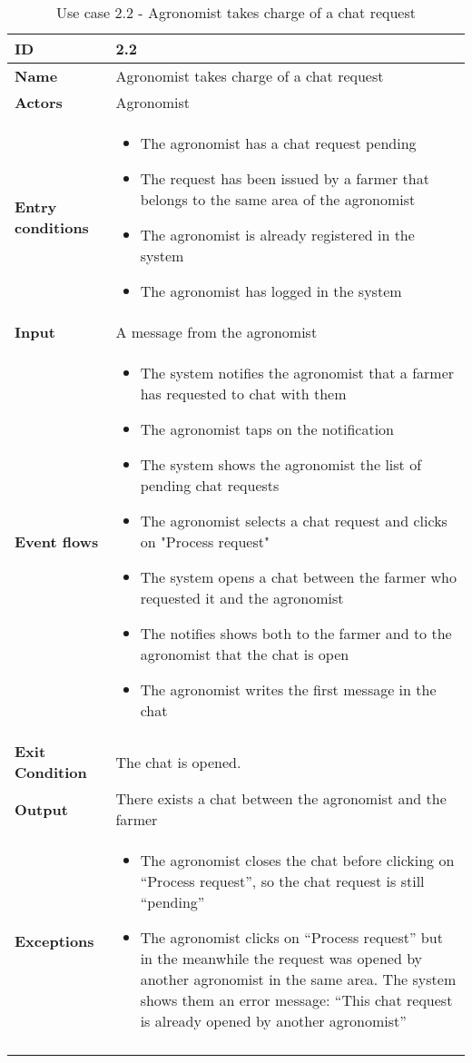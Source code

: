 \begin{longtable}[H]{ | l | p{10cm} | }
\hline
{\cellcolor[rgb]{0.753,0.753,0.753}}\textbf{ID}  & 2.2 \\ \hline
{\cellcolor[rgb]{0.753,0.753,0.753}}\textbf{Name} & Agronomist takes charge of a chat request \\ \hline
{\cellcolor[rgb]{0.753,0.753,0.753}}\textbf{Actors} & Agronomist \\ \hline
{\cellcolor[rgb]{0.753,0.753,0.753}}\textbf{Entry conditions} &
\begin{itemize}
    \item The agronomist has a chat request pending
    \item The request has been issued by a farmer that belongs to the same area of the agronomist
    \item The agronomist is already registered in the system
    \item The agronomist has logged in the system
\end{itemize}
\\ \hline
{\cellcolor[rgb]{0.753,0.753,0.753}}\textbf{Input} & A message from the agronomist\\ \hline
{\cellcolor[rgb]{0.753,0.753,0.753}}\textbf{Event flows} &
\begin{itemize}
    \item The system notifies the agronomist that a farmer has requested to chat with them
    \item The agronomist taps on the notification
    \item The system shows the agronomist the list of pending chat requests
    \item The agronomist selects a chat request and clicks on "Process request"
    \item The system opens a chat between the farmer who requested it and the agronomist
    \item The notifies shows both to the farmer and to the agronomist that the chat is open
    \item The agronomist writes the first message in the chat
\end{itemize}
\\ \hline
{\cellcolor[rgb]{0.753,0.753,0.753}}\textbf{Exit Condition} & The chat is opened.\\ \hline
{\cellcolor[rgb]{0.753,0.753,0.753}}\textbf{Output} & There exists a chat between the agronomist and the farmer\\ \hline
{\cellcolor[rgb]{0.753,0.753,0.753}}\textbf{Exceptions} &
\begin{itemize}
    \item The agronomist closes the chat before clicking on “Process request”, so the chat request is still “pending”
    \item The agronomist clicks on “Process request” but in the meanwhile the request was opened by another agronomist in the same area. The system shows them an error message: “This chat request is already opened by another agronomist”
\end{itemize}
\\ \hline
\caption{Use case 2.2 - Agronomist takes charge of a chat request}
\\
\end{longtable}